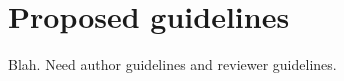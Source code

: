 \section{Proposed guidelines}\label{s:guidelines}

Blah. Need author guidelines and reviewer guidelines.